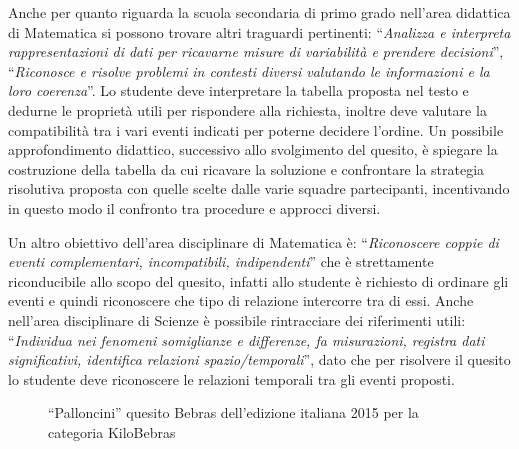 \documentclass[12pt]{report}
\begin{document}
Anche per quanto riguarda la scuola secondaria di primo grado nell'area didattica di Matematica si possono trovare altri traguardi pertinenti:
``\textit{Analizza e interpreta rappresentazioni di dati per ricavarne misure di variabilità e prendere decisioni}'', ``\textit{Riconosce e risolve problemi in contesti diversi valutando le informazioni e la loro coerenza}''.
Lo studente deve interpretare la tabella proposta nel testo e dedurne le proprietà utili per rispondere alla richiesta, inoltre deve valutare la compatibilità tra i vari eventi indicati per poterne decidere l'ordine.
Un possibile approfondimento didattico, successivo allo svolgimento del quesito, è spiegare la costruzione della tabella da cui ricavare la soluzione e confrontare la strategia risolutiva proposta con quelle scelte dalle varie squadre partecipanti, incentivando in questo modo il confronto tra procedure e approcci diversi.

Un altro obiettivo dell'area disciplinare di Matematica è: ``\textit{Riconoscere coppie di eventi complementari, incompatibili, indipendenti}'' che è strettamente riconducibile allo scopo del quesito, infatti allo studente è richiesto di ordinare gli eventi e quindi riconoscere che tipo di relazione intercorre tra di essi.
Anche nell'area disciplinare di Scienze è possibile rintracciare dei riferimenti utili:
``\textit{Individua nei fenomeni somiglianze e differenze, fa misurazioni, registra dati significativi, identifica relazioni spazio/temporali}'', dato che per risolvere il quesito lo studente deve riconoscere le relazioni temporali tra gli eventi proposti.



\bigskip
\begin{figure}[h]
	\centering
	\caption{``Palloncini'' quesito Bebras dell'edizione italiana 2015 per la categoria KiloBebras}\label{fig:palloncini}
\end{figure}
\end{document}

